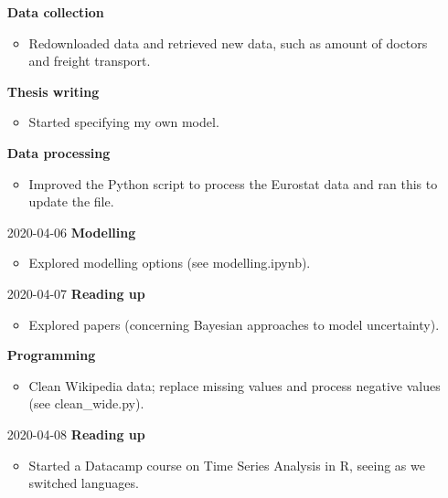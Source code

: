 \documentclass{article}
\begin{document}
\begin{itemize}
	\textbf{Data collection}
	\begin{itemize}
		\item Redownloaded data and retrieved new data, such as amount of doctors and freight transport.
	\end{itemize}
	
	\textbf{Thesis writing}
	\begin{itemize}
		\item Started specifying my own model.
	\end{itemize}

	\textbf{Data processing}
	\begin{itemize}
		\item Improved the Python script to process the Eurostat data and ran this to update the file.
	\end{itemize}
	
	\item[2020-04-06]
	\textbf{Modelling}
	\begin{itemize}
		\item Explored modelling options (see modelling.ipynb).
	\end{itemize}

	\item[2020-04-07]
	\textbf{Reading up}
	\begin{itemize}
		\item Explored papers (concerning Bayesian approaches to model uncertainty).
	\end{itemize}

	\textbf{Programming}
	\begin{itemize}
		\item Clean Wikipedia data; replace missing values and process negative values (see clean\_wide.py).
	\end{itemize}
	
	\item[2020-04-08]
	\textbf{Reading up}
	\begin{itemize}
		\item Started a Datacamp course on Time Series Analysis in R, seeing as we switched languages.
	\end{itemize}


\end{itemize}
\end{document}
